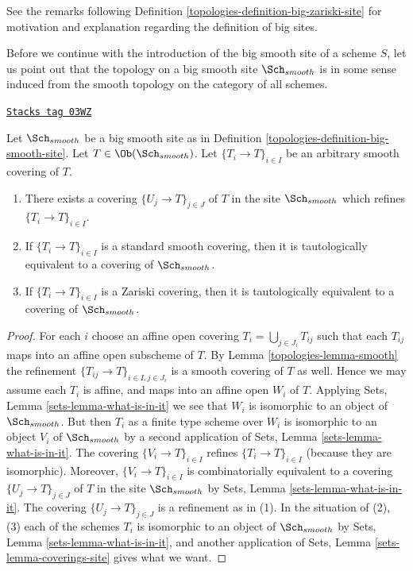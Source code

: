 See the remarks following Definition \ref{topologies-definition-big-zariski-site}
for motivation and explanation regarding the definition of big sites.

\medskip\noindent
Before we continue with the introduction of the big smooth site of
a scheme $S$, let us point out that the topology on a big smooth site
$\Sch_{smooth}$ is in some sense induced from the smooth topology
on the category of all schemes.

\begin{lemma}
\label{topologies-lemma-smooth-induced}
\href{https://stacks.math.columbia.edu/tag/03WZ}{\texttt{Stacks tag 03WZ}}

Let $\Sch_{smooth}$ be a big smooth site as in
Definition \ref{topologies-definition-big-smooth-site}.
Let $T \in \Ob(\Sch_{smooth})$.
Let $\{T_i \to T\}_{i \in I}$ be an arbitrary smooth covering of $T$.
\begin{enumerate}
\item There exists a covering $\{U_j \to T\}_{j \in J}$ of $T$ in the site
$\Sch_{smooth}$ which refines $\{T_i \to T\}_{i \in I}$.
\item If $\{T_i \to T\}_{i \in I}$ is a standard smooth covering, then
it is tautologically equivalent to a covering of $\Sch_{smooth}$.
\item If $\{T_i \to T\}_{i \in I}$ is a Zariski covering, then
it is tautologically equivalent to a covering of $\Sch_{smooth}$.
\end{enumerate}
\end{lemma}

\begin{proof}

For each $i$ choose an affine open covering $T_i = \bigcup_{j \in J_i} T_{ij}$
such that each $T_{ij}$ maps into an affine open subscheme of $T$. By
Lemma \ref{topologies-lemma-smooth}
the refinement $\{T_{ij} \to T\}_{i \in I, j \in J_i}$ is a smooth covering
of $T$ as well. Hence we may assume each $T_i$ is affine, and maps into
an affine open $W_i$ of $T$. Applying
Sets, Lemma \ref{sets-lemma-what-is-in-it}
we see that $W_i$ is isomorphic to an object of $\Sch_{smooth}$.
But then $T_i$ as a finite type scheme over $W_i$
is isomorphic to an object $V_i$ of $\Sch_{smooth}$ by a second
application of
Sets, Lemma \ref{sets-lemma-what-is-in-it}.
The covering $\{V_i \to T\}_{i \in I}$ refines $\{T_i \to T\}_{i \in I}$
(because they are isomorphic).
Moreover, $\{V_i \to T\}_{i \in I}$ is combinatorially equivalent to a
covering $\{U_j \to T\}_{j \in J}$ of $T$ in the site
$\Sch_{smooth}$ by
Sets, Lemma \ref{sets-lemma-what-is-in-it}.
The covering $\{U_j \to T\}_{j \in J}$ is a refinement as in (1).
In the situation of (2), (3) each of the
schemes $T_i$ is isomorphic to an object of $\Sch_{smooth}$ by
Sets, Lemma \ref{sets-lemma-what-is-in-it},
and another application of
Sets, Lemma \ref{sets-lemma-coverings-site}
gives what we want.
\end{proof}

